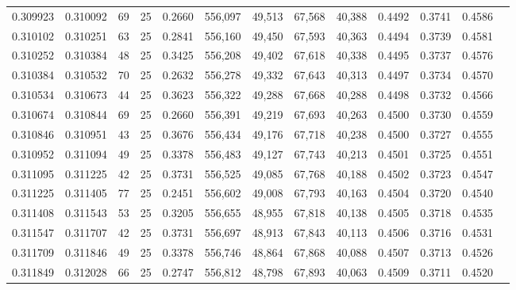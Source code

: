 \begin{tabular}{rrrrrrrrrrrrr}
0.309923 & 0.310092 &    69 &  25 &                                     0.2660 & 556,097 &  49,513 &  67,568 &  40,388 & 0.4492 & 0.3741 & 0.4586 \\
0.310102 & 0.310251 &    63 &  25 &                                     0.2841 & 556,160 &  49,450 &  67,593 &  40,363 & 0.4494 & 0.3739 & 0.4581 \\
0.310252 & 0.310384 &    48 &  25 &                                     0.3425 & 556,208 &  49,402 &  67,618 &  40,338 & 0.4495 & 0.3737 & 0.4576 \\
0.310384 & 0.310532 &    70 &  25 &                                     0.2632 & 556,278 &  49,332 &  67,643 &  40,313 & 0.4497 & 0.3734 & 0.4570 \\
0.310534 & 0.310673 &    44 &  25 &                                     0.3623 & 556,322 &  49,288 &  67,668 &  40,288 & 0.4498 & 0.3732 & 0.4566 \\
0.310674 & 0.310844 &    69 &  25 &                                     0.2660 & 556,391 &  49,219 &  67,693 &  40,263 & 0.4500 & 0.3730 & 0.4559 \\
0.310846 & 0.310951 &    43 &  25 &                                     0.3676 & 556,434 &  49,176 &  67,718 &  40,238 & 0.4500 & 0.3727 & 0.4555 \\
0.310952 & 0.311094 &    49 &  25 &                                     0.3378 & 556,483 &  49,127 &  67,743 &  40,213 & 0.4501 & 0.3725 & 0.4551 \\
0.311095 & 0.311225 &    42 &  25 &                                     0.3731 & 556,525 &  49,085 &  67,768 &  40,188 & 0.4502 & 0.3723 & 0.4547 \\
0.311225 & 0.311405 &    77 &  25 &                                     0.2451 & 556,602 &  49,008 &  67,793 &  40,163 & 0.4504 & 0.3720 & 0.4540 \\
0.311408 & 0.311543 &    53 &  25 &                                     0.3205 & 556,655 &  48,955 &  67,818 &  40,138 & 0.4505 & 0.3718 & 0.4535 \\
0.311547 & 0.311707 &    42 &  25 &                                     0.3731 & 556,697 &  48,913 &  67,843 &  40,113 & 0.4506 & 0.3716 & 0.4531 \\
0.311709 & 0.311846 &    49 &  25 &                                     0.3378 & 556,746 &  48,864 &  67,868 &  40,088 & 0.4507 & 0.3713 & 0.4526 \\
0.311849 & 0.312028 &    66 &  25 &                                     0.2747 & 556,812 &  48,798 &  67,893 &  40,063 & 0.4509 & 0.3711 & 0.4520 \\

\end{tabular}
